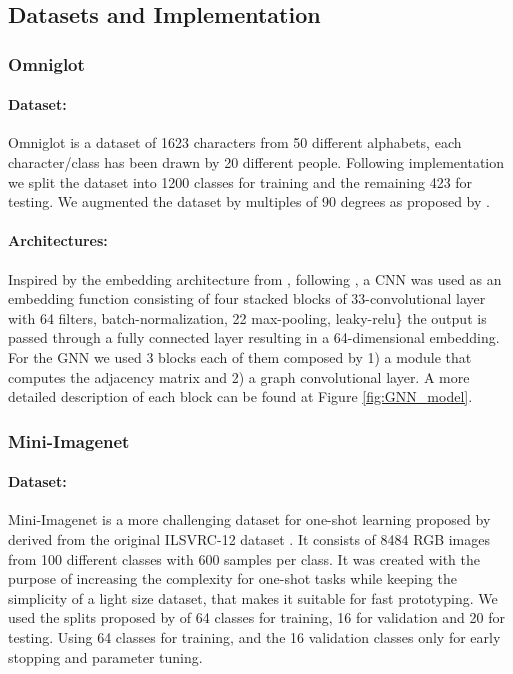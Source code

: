 \documentclass{article} \usepackage{iclr2018_conference,times}
\begin{document}
\subsection{Datasets and Implementation}
\subsubsection{Omniglot}

\paragraph{Dataset:}
Omniglot is a dataset of 1623 characters from 50 different alphabets, each character/class has been drawn by 20 different people. Following \cite{vinyals2016matching} implementation we split the dataset into 1200 classes for training and the remaining 423 for testing. We augmented the dataset by multiples of 90 degrees as proposed by \cite{santoro2016meta}.

\paragraph{Architectures:}
\label{architecture_omniglot}
Inspired by the embedding architecture from \cite{vinyals2016matching}, following \cite{mishra2017meta}, a CNN was used as an embedding  function consisting of four stacked blocks of 33-convolutional layer with 64 filters, batch-normalization, 22 max-pooling, leaky-relu\} the output is passed through a fully connected layer resulting in a 64-dimensional embedding. For the GNN we used 3 blocks each of them composed by 1) a module that computes the adjacency matrix and 2) a graph convolutional layer. A more detailed description of each block can be found at Figure \ref{fig:GNN_model}.


\subsubsection{Mini-Imagenet}
\paragraph{Dataset:}  Mini-Imagenet is a more challenging dataset for one-shot learning proposed by \cite{vinyals2016matching} derived from the original ILSVRC-12 dataset \cite{krizhevsky2012imagenet}. It consists of 8484 RGB images from 100 different classes with 600 samples per class. It was created with the purpose of increasing the complexity for one-shot tasks while keeping the simplicity of a light size dataset, that makes it suitable for fast prototyping. We used the splits proposed by \cite{ravi2016optimization} of 64 classes for training, 16 for validation and 20 for testing. Using 64 classes for training, and the 16 validation classes only for early stopping and parameter tuning.
\end{document}
